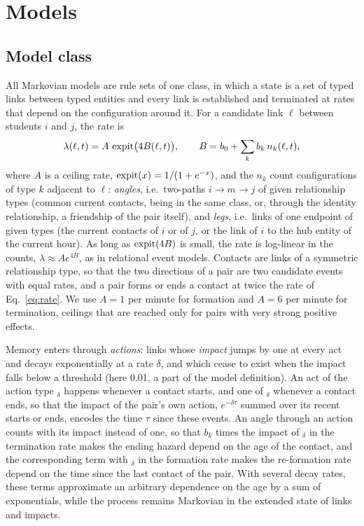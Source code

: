 \section{Models}\label{sec:models}

\subsection{Model class}
All Markovian models are rule sets of one class, in which a state is a set of typed links between typed entities and every link is established and terminated at rates that depend on the configuration around it.
For a candidate link $\ell$ between students $i$ and $j$, the rate is
\begin{equation}\label{eq:rate}
  \lambda(\ell, t) = A\, \operatorname{expit}\bigl(4 B(\ell, t)\bigr), \qquad B = b_0 + \sum_k b_k\, n_k(\ell, t),
\end{equation}
where $A$ is a ceiling rate, $\operatorname{expit}(x) = 1/(1 + e^{-x})$, and the $n_k$ count configurations of type $k$ adjacent to $\ell$: \emph{angles}, i.e.\ two-paths $i \to m \to j$ of given relationship types (common current contacts, being in the same class, or, through the identity relationship, a friendship of the pair itself), and \emph{legs}, i.e.\ links of one endpoint of given types (the current contacts of $i$ or of $j$, or the link of $i$ to the hub entity of the current hour).
As long as $\operatorname{expit}(4B)$ is small, the rate is log-linear in the counts, $\lambda \approx A e^{4B}$, as in relational event models.
Contacts are links of a symmetric relationship type, so that the two directions of a pair are two candidate events with equal rates, and a pair forms or ends a contact at twice the rate of Eq.~\eqref{eq:rate}.
We use $A = 1$ per minute for formation and $A = 6$ per minute for termination, ceilings that are reached only for pairs with very strong positive effects.

Memory enters through \emph{actions}: links whose \emph{impact} jumps by one at every act and decays exponentially at a rate $\delta$, and which cease to exist when the impact falls below a threshold (here 0.01, a part of the model definition).
An act of the action type $_\delta$ happens whenever a contact starts, and one of $_\delta$ whenever a contact ends, so that the impact of the pair's own action, $e^{-\delta \tau}$ summed over its recent starts or ends, encodes the time $\tau$ since these events.
An angle through an action counts with its impact instead of one, so that $b_k$ times the impact of $_\delta$ in the termination rate makes the ending hazard depend on the age of the contact, and the corresponding term with $_\delta$ in the formation rate makes the re-formation rate depend on the time since the last contact of the pair.
With several decay rates, these terms approximate an arbitrary dependence on the age by a sum of exponentials, while the process remains Markovian in the extended state of links and impacts.

